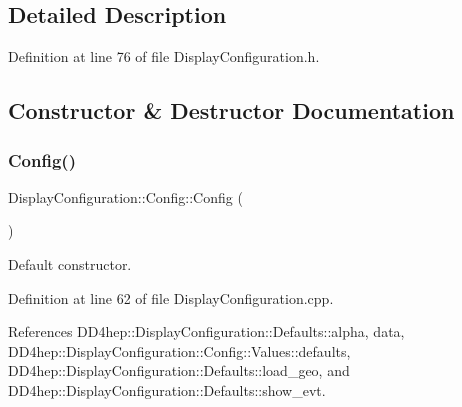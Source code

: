 \subsection{Detailed Description}


Definition at line 76 of file Display\+Configuration.\+h.



\subsection{Constructor \& Destructor Documentation}
\hypertarget{class_d_d4hep_1_1_display_configuration_1_1_config_ae8da46c00b3e85bc7c2a247175216bbc}{}\label{class_d_d4hep_1_1_display_configuration_1_1_config_ae8da46c00b3e85bc7c2a247175216bbc} 
\subsubsection{\texorpdfstring{Config()}{Config()}\hspace{0.1cm}{\footnotesize\ttfamily [1/2]}}
{\footnotesize\ttfamily Display\+Configuration\+::\+Config\+::\+Config (\begin{DoxyParamCaption}{ }\end{DoxyParamCaption})}



Default constructor. 



Definition at line 62 of file Display\+Configuration.\+cpp.



References D\+D4hep\+::\+Display\+Configuration\+::\+Defaults\+::alpha, data, D\+D4hep\+::\+Display\+Configuration\+::\+Config\+::\+Values\+::defaults, D\+D4hep\+::\+Display\+Configuration\+::\+Defaults\+::load\+\_\+geo, and D\+D4hep\+::\+Display\+Configuration\+::\+Defaults\+::show\+\_\+evt.

\hypertarget{class_d_d4hep_1_1_display_configuration_1_1_config_ab5d7a0d2cf59ed2ca47afabd66fd2918}{}\label{class_d_d4hep_1_1_display_configuration_1_1_config_ab5d7a0d2cf59ed2ca47afabd66fd2918} 
